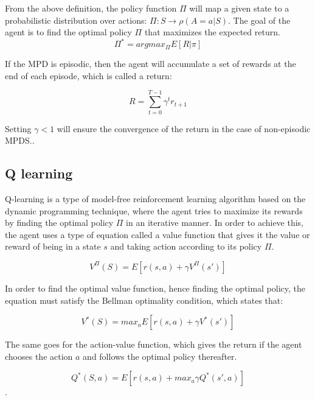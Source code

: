 \documentclass[12pt]{extarticle}
\begin{document}
\newpage
From the above definition, the policy function $\Pi$ will map a given state to a probabilistic distribution over actions: $\Pi: S \longrightarrow \rho(A=a|S)$. The goal of the agent is to find the optimal policy $\Pi$ that maximizes the expected return. \\
\[ \Pi^{*} = argmax_{\Pi}  E[R|\pi] \]



If the MPD is episodic, then the agent will accumulate a set of rewards at the end of each episode, which is called a return:

\[ R= \sum_{t=0}^{T-1} \gamma^{t}r_{t+1} \]



Setting $\gamma<1$ will ensure the convergence of the return in the case of non-episodic MPDS.\cite{arulkumaran2017brief}.

\subsection{Q learning}
Q-learning is a type of model-free reinforcement learning algorithm based on the dynamic programming technique, where the agent tries to maximize its rewards by finding the optimal policy $\Pi$ in an iterative manner. In order to achieve this, the agent uses a type of equation called a value function that gives it the value or reward of being in a state $s$ and taking action according to its policy $\Pi$.\cite{watkins1992q}


\[ V^{\Pi}(S)=E[r(s,a)+\gamma V^{\Pi}(s') ] \] 

In order to find the optimal value function, hence finding the optimal policy, the equation must satisfy the Bellman optimality condition, which states that: 

  
\[ V^{*}(S)=max_{a}E[r(s,a)+\gamma V^{*}(s') ] \] 

The same goes for the action-value function, which gives the return if the agent chooses the action $a$ and follows the optimal policy thereafter.

\[ Q^{*}(S,a)=E[r(s,a)+max_{a}\gamma Q^{*}(s',a) ] \].


\pagebreak
\end{document}
